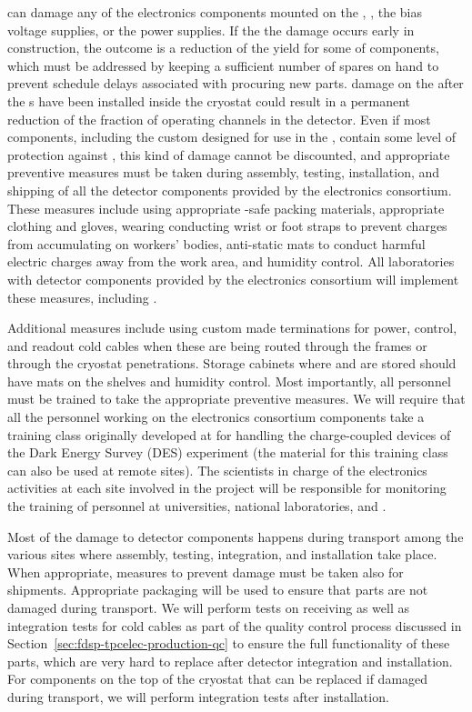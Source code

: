  can damage any of the electronics
components mounted on the , ,
the bias voltage supplies, or the power supplies. If the
the damage occurs early in construction, 
the outcome is a reduction
of the yield for some of components, which must be
addressed by keeping a sufficient number of spares on hand to prevent
schedule delays associated with procuring new parts. 
damage on the  after the s have been
installed inside the cryostat could result in a permanent
reduction of the fraction of operating channels in the
detector. Even if most components, including the custom 
 designed for use in the , contain 
some level of protection  against , this kind of damage cannot be discounted, and appropriate 
preventive measures must be taken during  
assembly, testing, installation, and shipping of all the detector 
components provided by the  electronics consortium. These 
measures include using appropriate -safe packing materials, 
appropriate clothing and gloves, wearing conducting wrist or foot straps 
to prevent charges from accumulating 
on workers' bodies, anti-static mats to conduct harmful electric 
charges away from the work area, and humidity control. All laboratories with detector components provided by the  electronics consortium will implement these
measures, including . 

Additional measures
include using custom made terminations for 
power, control, and readout cold cables when these
are being routed through the  frames or through the
cryostat penetrations. Storage cabinets where  and
 are stored should have  mats
on the shelves and humidity control. Most importantly, all personnel must be trained to take the appropriate preventive measures. We 
will require that all the personnel working on the  electronics 
consortium components take a training class originally developed 
at  for handling the charge-coupled devices of the Dark Energy Survey (DES) experiment 
(the material for this training class can also be used at remote 
sites). The scientists in charge of the  electronics activities at each site involved in the project will be responsible for monitoring the training of personnel at universities, national laboratories,
and .

Most of the damage to detector components happens during 
transport among the various sites where assembly, testing, integration,
and installation take place. When appropriate, measures to prevent
 damage must be taken also for shipments. Appropriate 
packaging will be used to ensure that parts are not damaged
during transport. We will perform tests on receiving  
 as well as integration tests for cold cables as
part of the quality control process discussed in 
Section~\ref{sec:fdsp-tpcelec-production-qc} to ensure the 
full functionality of these parts, which are very hard to replace 
after detector integration and installation. For  
components on the top of the cryostat that
can be replaced if damaged during transport, we will 
perform integration tests after installation.

